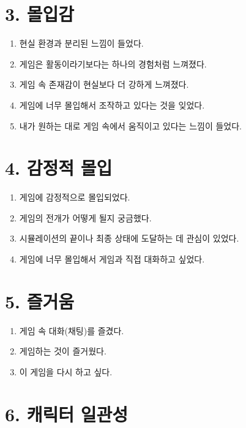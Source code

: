 \documentclass[12pt]{article}
\begin{document}
\section*{3. 몰입감}

\begin{enumerate}[resume]
  \item 현실 환경과 분리된 느낌이 들었다.
  \item 게임은 활동이라기보다는 하나의 경험처럼 느껴졌다.
  \item 게임 속 존재감이 현실보다 더 강하게 느껴졌다.
  \item 게임에 너무 몰입해서 조작하고 있다는 것을 잊었다.
  \item 내가 원하는 대로 게임 속에서 움직이고 있다는 느낌이 들었다.
\end{enumerate}

\section*{4. 감정적 몰입}

\begin{enumerate}[resume]
  \item 게임에 감정적으로 몰입되었다.
  \item 게임의 전개가 어떻게 될지 궁금했다.
  \item 시뮬레이션의 끝이나 최종 상태에 도달하는 데 관심이 있었다.
  \item 게임에 너무 몰입해서 게임과 직접 대화하고 싶었다.
\end{enumerate}

\section*{5. 즐거움}

\begin{enumerate}[resume]
  \item 게임 속 대화(채팅)를 즐겼다.
  \item 게임하는 것이 즐거웠다.
  \item 이 게임을 다시 하고 싶다.
\end{enumerate}

\section*{6. 캐릭터 일관성}
\end{document}
